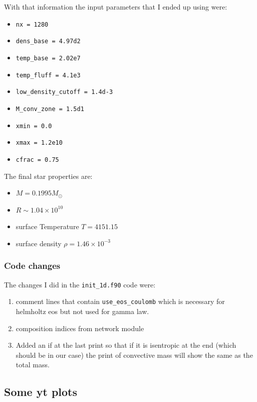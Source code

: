 \documentclass[11pt]{article}
\begin{document}
With that information the input parameters that I ended up using were:
\begin{itemize}

	\item {\tt nx = 1280}
	\item {\tt dens\_base = 4.97d2}
	\item {\tt temp\_base = 2.02e7}
	\item {\tt temp\_fluff = 4.1e3}
	\item {\tt low\_density\_cutoff = 1.4d-3}
	\item {\tt M\_conv\_zone = 1.5d1}
	\item {\tt xmin = 0.0}
	\item {\tt xmax = 1.2e10}
	\item {\tt cfrac = 0.75}

\end{itemize}

The final star properties are:
\begin{itemize}
	\item $M = 0.1995 M_\odot$
	\item $R \sim 1.04 \times 10^{10}$
	\item surface Temperature $T = 4151.15$
	\item surface density $\rho = 1.46 \times 10^{-3}$
\end{itemize}

\subsubsection{Code changes}
The changes I did in the {\tt init\_1d.f90} code were: 
\begin{enumerate}
	\item comment lines that contain {\tt use\_eos\_coulomb} which is necessary for helmholtz eos but not used for gamma law.
	
	\item composition indices from network module 
	\item Added an if at the last print so that if it is isentropic at the end (which should be in our case) the print of convective mass will show the same as the total mass.  
\end{enumerate}


\subsection{Some yt plots}
\end{document}
